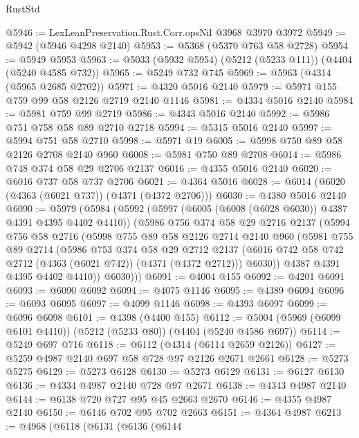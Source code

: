\begin{lexlean}{RustStd}
\begin{coremodule}
{\begin{coremodule}
{{{{{{{{{{{{{{{{@5946 := LexLeanPreservation.Rust.Corr.opsNil @3968 @3970 @3972
@5949 := @5942 (@5946 @4298 @2140)
@5953 := @5368 (@5370 @763 @58 @2728)
@5954 := @5949 @5953
@5963 := @5033 (@5932 @5954) (@5212 (@5233 @111)) (@4404 (@5240 @4585 @732))
@5965 := @5249 @732 @745
@5969 := @5963 (@4314 (@5965 @2685 @2702))
@5971 := @4320 @5016 @2140
@5979 := @5971 @155 @759 @99 @58 @2126 @2719 @2140 @1146
@5981 := @4334 @5016 @2140
@5984 := @5981 @759 @99 @2719
@5986 := @4343 @5016 @2140
@5992 := @5986 @751 @758 @58 @89 @2710 @2718
@5994 := @5315 @5016 @2140
@5997 := @5994 @751 @58 @2710
@5998 := @5971 @19
@6005 := @5998 @750 @89 @58 @2126 @2708 @2140 @960
@6008 := @5981 @750 @89 @2708
@6014 := @5986 @748 @374 @58 @29 @2706 @2137
@6016 := @4355 @5016 @2140
@6020 := @6016 @737 @58 @737 @2706
@6021 := @4364 @5016
@6028 := @6014 (@6020 (@4363 (@6021 @737)) (@4371 (@4372 @2706)))
@6030 := @4380 @5016 @2140
@6090 := @5979
    (@5984
      (@5992
        (@5997 (@6005 (@6008 (@6028 @6030)) @4387 @4391 @4395 @4402 @4410))
        (@5986
          @756
          @374
          @58
          @29
          @2716
          @2137
          (@5994
            @756
            @58
            @2716
            (@5998
              @755
              @89
              @58
              @2126
              @2714
              @2140
              @960
              (@5981
                @755
                @89
                @2714
                (@5986
                  @753
                  @374
                  @58
                  @29
                  @2712
                  @2137
                  (@6016 @742 @58 @742 @2712 (@4363 (@6021 @742)) (@4371 (@4372 @2712)))
                  @6030))
              @4387
              @4391
              @4395
              @4402
              @4410))
          @6030)))
@6091 := @4004 @155
@6092 := @4201 @6091
@6093 := @6090 @6092
@6094 := @4075 @1146
@6095 := @4389 @6094
@6096 := @6093 @6095
@6097 := @4099 @1146
@6098 := @4393 @6097
@6099 := @6096 @6098
@6101 := @4398 (@4400 @155)
@6112 := @5004 (@5969 (@6099 @6101 @4410)) (@5212 (@5233 @80)) (@4404 (@5240 @4586 @697))
@6114 := @5249 @697 @716
@6118 := @6112 (@4314 (@6114 @2659 @2126))
@6127 := @5259 @4987 @2140 @697 @58 @728 @97 @2126 @2671 @2661
@6128 := @5273 @5275
@6129 := @5273 @6128
@6130 := @5273 @6129
@6131 := @6127 @6130
@6136 := @4334 @4987 @2140 @728 @97 @2671
@6138 := @4343 @4987 @2140
@6144 := @6138 @720 @727 @95 @45 @2663 @2670
@6146 := @4355 @4987 @2140
@6150 := @6146 @702 @95 @702 @2663
@6151 := @4364 @4987
@6213 := @4968
    (@6118
      (@6131
        (@6136
          (@6144
}}}}}}}}}}}}}}}}
\end{coremodule}}
\end{coremodule}
\end{lexlean}
